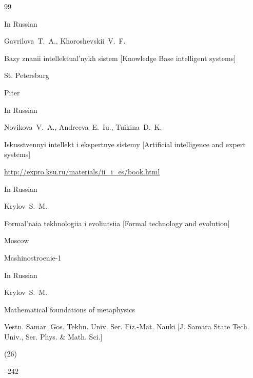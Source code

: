 \begin{thebibliography}{99}




\lang In Russian

\by Gavrilova~T.~A., Khoroshevskii~V.~F.

\book Bazy znanii intellektual'nykh sistem \rm [Knowledge Base intelligent systems]

\publaddr St. Petersburg

\publ Piter






\lang In Russian

\by Novikova~V.~A., Andreeva~E.~Iu., Tuikina~D.~K.

\preprint Iskusstvennyi intellekt i ekspertnye sistemy \rm [Artificial intelligence and expert systems]


\elink \url{http://expro.ksu.ru/materials/ii_i_es/book.html}






\lang In Russian

\by Krylov~S.~M.

\book Formal'naia tekhnologiia i evoliutsiia \rm [Formal technology and evolution]

\publ Moscow

\publaddr Mashinostroenie-1








\lang In Russian

\by Krylov~S.~M.

\paper Mathematical foundations of metaphysics

\jour Vestn. Samar. Gos. Tekhn. Univ. Ser. Fiz.-Mat. Nauki \rm [J. Samara State Tech. Univ., Ser. Phys. \& Math. Sci.]


(26)

--242





\end{thebibliography}
